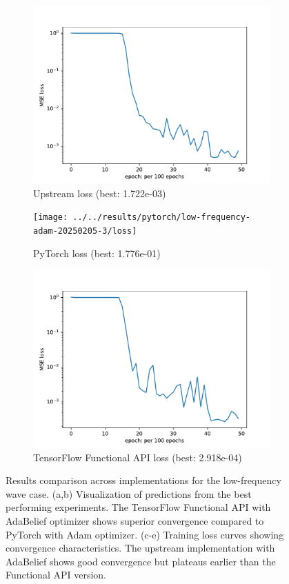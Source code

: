 \documentclass[10pt,journal,compsoc,onecolumn]{IEEEtran}
\begin{document}
\begin{figure}[t]
    \begin{subfigure}[b]{0.32\linewidth}
        \includegraphics[width=\linewidth]{../../results/upstream/low-frequency-adabelief-20250206-1105-3/loss}
        \caption{Upstream loss (best: 1.722e-03)}
    \end{subfigure}
    \begin{subfigure}[b]{0.32\linewidth}
        \texttt{[image: ../../results/pytorch/low-frequency-adam-20250205-3/loss]}
        \caption{PyTorch loss (best: 1.776e-01)}
    \end{subfigure}
    \begin{subfigure}[b]{0.32\linewidth}
        \includegraphics[width=\linewidth]{../../results/functional/low-frequency-adabelief-20250206-1105-1/loss}
        \caption{TensorFlow Functional API loss (best: 2.918e-04)}
    \end{subfigure}
    \caption{Results comparison across implementations for the low-frequency wave case. (a,b) Visualization of predictions from the best performing experiments. The TensorFlow Functional API with AdaBelief optimizer shows superior convergence compared to PyTorch with Adam optimizer. (c-e) Training loss curves showing convergence characteristics. The upstream implementation with AdaBelief shows good convergence but plateaus earlier than the Functional API version.}
    \label{fig:results}
\end{figure}
\end{document}
